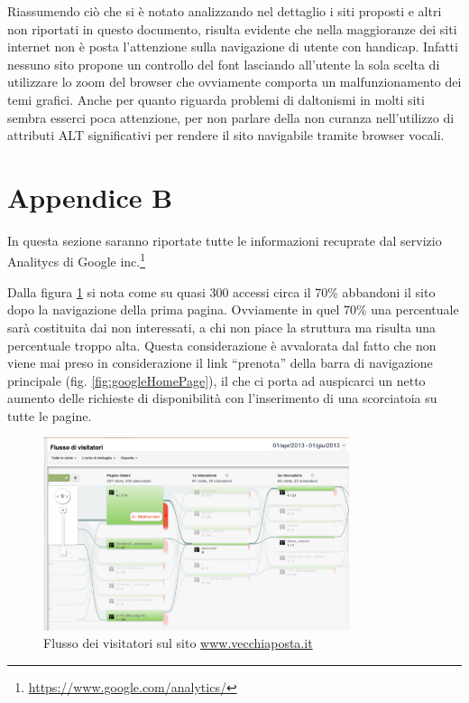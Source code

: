 \documentclass[a4paper,12pt,hidelinks]{report}
\begin{document}
  Riassumendo ciò che si è notato analizzando nel dettaglio i siti proposti e altri non riportati in questo documento, risulta evidente che nella maggioranze dei siti internet
  non è posta l'attenzione sulla navigazione di utente con handicap. Infatti nessuno sito propone un controllo del font lasciando all'utente la sola scelta di utilizzare 
  lo zoom del browser che ovviamente comporta un malfunzionamento dei temi grafici. 
  Anche per quanto riguarda problemi di daltonismi in molti siti sembra esserci poca attenzione, per non parlare della non curanza nell'utilizzo di attributi ALT significativi
  per rendere il sito navigabile tramite browser vocali.
  
\section{Appendice B}
  In questa sezione saranno riportate tutte le informazioni recuprate dal servizio Analitycs di Google inc.\footnote{\url{https://www.google.com/analytics/}}
  \par Dalla figura \ref{fig:googleFlusso} si nota come su quasi 300 accessi circa il 70\% abbandoni il sito dopo la navigazione della prima pagina. Ovviamente in quel 70\% una 
  percentuale sarà costituita dai non interessati, a chi non piace la struttura ma risulta una percentuale troppo alta. Questa considerazione è avvalorata dal fatto che 
  non viene mai preso in considerazione il link ``prenota'' della barra di navigazione principale (fig. \ref{fig:googleHomePage}), il che ci porta ad auspicarci un netto aumento delle richieste di
  disponibilità con l'inserimento di una scorciatoia su tutte le pagine.
  \begin{figure}[h!]%
    \includegraphics[width=0.80\textwidth,keepaspectratio=true]{img/googleFlusso}
    \centering
    \caption{Flusso dei visitatori sul sito \url{www.vecchiaposta.it}}%
    \label{fig:googleFlusso}%
  \end{figure}
\end{document}
